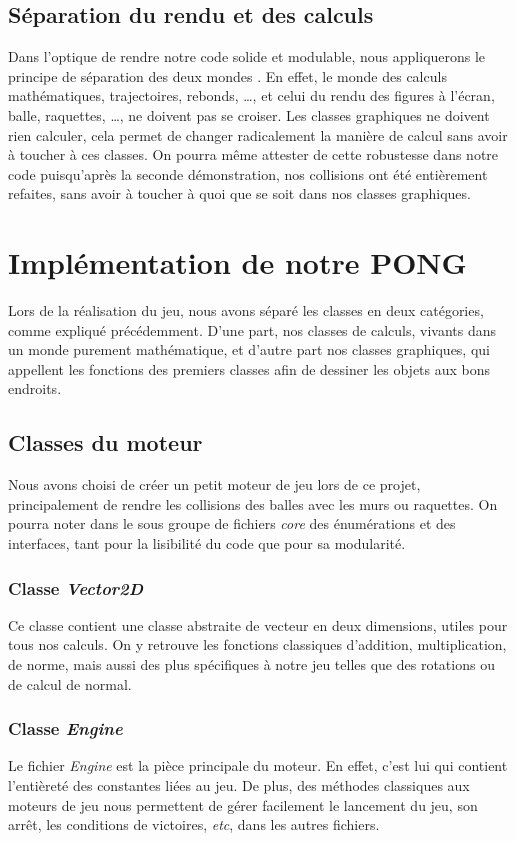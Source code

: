\documentclass[a4paper,10pt]{article}
\theoremstyle{definition}
\begin{document}
    \subsection{Séparation du rendu et des calculs}
    Dans l'optique de rendre notre code solide et modulable, nous appliquerons le principe de \og séparation des deux mondes \fg{}. En effet, le monde des calculs mathématiques, trajectoires, rebonds, \dots, et celui du rendu des figures à l'écran, balle, raquettes, \dots, ne doivent pas se croiser. Les classes graphiques ne doivent rien calculer, cela permet de changer radicalement la manière de calcul sans avoir à toucher à ces classes. On pourra même attester de cette robustesse dans notre code puisqu'après la seconde démonstration, nos collisions ont été entièrement refaites, sans avoir à toucher à quoi que se soit dans nos classes graphiques.
    
\section{Implémentation de notre PONG}
%

Lors de la réalisation du jeu, nous avons séparé les classes en deux catégories, comme expliqué précédemment. D'une part, nos classes de calculs, vivants dans un monde purement mathématique, et d'autre part nos classes graphiques, qui appellent les fonctions des premiers classes afin de dessiner les objets aux bons endroits.

    \subsection{Classes du moteur}
    Nous avons choisi de créer un petit moteur de jeu lors de ce projet, principalement de rendre les collisions des balles avec les murs ou raquettes. On pourra noter dans le sous groupe de fichiers \emph{core} des énumérations et des interfaces, tant pour la lisibilité du code que pour sa modularité.
    	
	\subsubsection{Classe \emph{Vector2D}}
	Ce classe contient une classe abstraite de vecteur en deux dimensions, utiles pour tous nos calculs. On y retrouve les fonctions classiques d'addition, multiplication, de norme, mais aussi des plus spécifiques à notre jeu telles que des rotations ou de calcul de normal.
	
	\subsubsection{Classe \emph{Engine}}
	Le fichier \emph{Engine} est la pièce principale du moteur. En effet, c'est lui qui contient l'entièreté des constantes liées au jeu. De plus, des méthodes classiques aux moteurs de jeu nous permettent de gérer facilement le lancement du jeu, son arrêt, les conditions de victoires, \emph{etc}, dans les autres fichiers.
	
\end{document}
